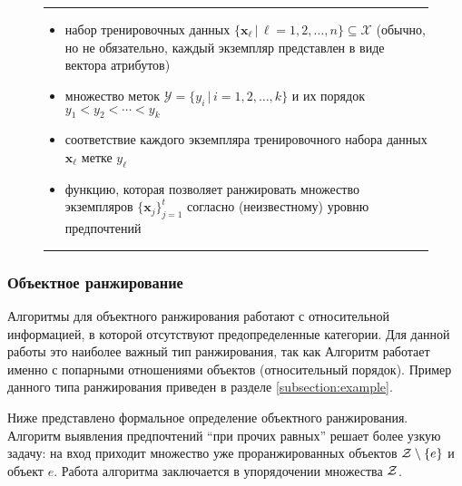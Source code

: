 	\begin{figure}[h!]
		\hrule
		\begin{description}[nosep]
			\item[Дано:] \null\leavevmode
			\begin{itemize}[itemsep=0pt,leftmargin=2ex,label=\textbf{---}]
				\item набор тренировочных данных $\{\bm{x}_\ell \, | \, \ell = 1,2,\dots,n\} \subseteq \mathcal{X} $ (обычно, но не обязательно, каждый экземпляр представлен в виде вектора атрибутов)
				\item множество меток $\mathcal{Y} = \{y_i\,|\,i = 1,2,\dotsc,k\}$ и их порядок $y_1 < y_2 < \dotsb < y_k$ 
				\item соответствие каждого экземпляра тренировочного набора данных $\bm{x}_\ell$ метке $y_\ell$
			\end{itemize}
			\item[Найти:] \null\leavevmode
			\begin{itemize}[itemsep=0pt,leftmargin=2ex,label=\textbf{---}]
				\item функцию, которая позволяет ранжировать множество экземпляров $\{\bm{x}_j\}^t_{j=1}$ согласно (неизвестному) уровню предпочтений
			\end{itemize}
		\end{description} 
		\hrule
		\label{fig:instance_ranking}
	\end{figure}
	
	\subsubsection{Объектное ранжирование}
	Алгоритмы для объектного ранжирования работают с 
	относительной %
	информацией, в которой отсутствуют предопределенные категории. Для данной работы это наиболее важный тип ранжирования, так как  Алгоритм работает именно с попарными отношениями объектов (относительный порядок). Пример данного типа ранжирования приведен в разделе \ref{subsection:example}.
	
	Ниже представлено формальное определение объектного ранжирования. Алгоритм выявления предпочтений \enquote{при прочих равных} решает более узкую задачу: на вход приходит множество уже проранжированных объектов $\mathcal{Z} \setminus \{e\}$ и объект $e$. Работа алгоритма заключается в упорядочении множества $\mathcal{Z}$.
	
